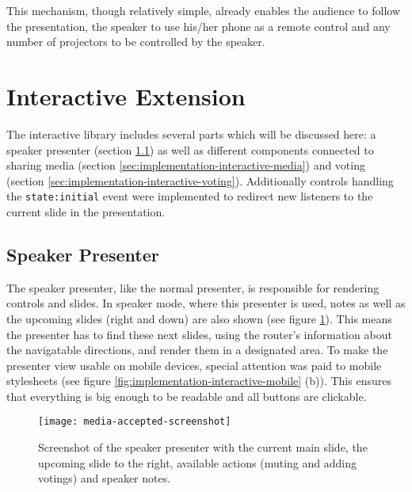This mechanism, though relatively simple, already enables the audience to follow the presentation, the speaker to use his/her phone as a remote control and any number of projectors to be controlled by the speaker.

\section{Interactive Extension}
\label{sec:implementation-interactive}
The interactive library includes several parts which will be discussed here: a speaker presenter (section \ref{sec:implementation-interactive-speaker-presenter}) as well as different components connected to sharing media (section \ref{sec:implementation-interactive-media}) and voting (section \ref{sec:implementation-interactive-voting}). Additionally controls handling the \texttt{state:initial} event were implemented to redirect new listeners to the current slide in the presentation.

\subsection{Speaker Presenter}
\label{sec:implementation-interactive-speaker-presenter}

The speaker presenter, like the normal presenter, is responsible for rendering controls and slides. In speaker mode, where this presenter is used, notes as well as the upcoming slides (right and down) are also shown (see figure \ref{fig:implementation-interactive-speaker-presenter}).
This means the presenter has to find these next slides, using the router's information about the navigatable directions, and render them in a designated area. To make the presenter view usable on mobile devices, special attention was paid to mobile stylesheets (see figure \ref{fig:implementation-interactive-mobile} (b)). This ensures that everything is big enough to be readable and all buttons are clickable.

\begin{figure}
\centering
\texttt{[image: media-accepted-screenshot]}
\caption{Screenshot of the speaker presenter with the current main slide, the upcoming slide to the right, available actions (muting and adding votings) and speaker notes.}
\label{fig:implementation-interactive-speaker-presenter}
\end{figure}

